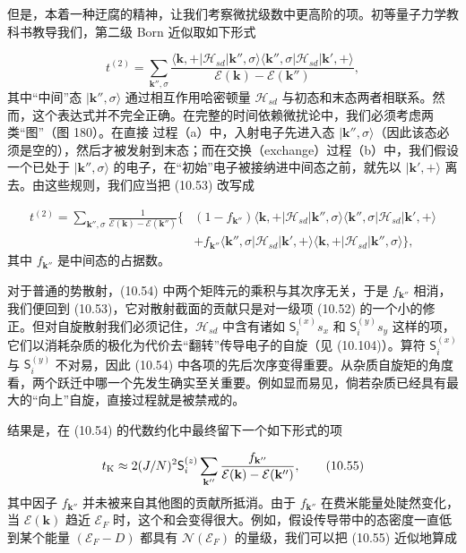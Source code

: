 但是，本着一种迂腐的精神，让我们考察微扰级数中更高阶的项。初等量子力学教科书教导我们，第二级 Born 近似取如下形式

\begin{equation*}
t^{(2)} = \sum_{\mathbf{k}'',\sigma} \frac{\langle \mathbf{k}, + | \mathcal{H}_{sd} | \mathbf{k}'', \sigma \rangle \langle \mathbf{k}'', \sigma | \mathcal{H}_{sd} | \mathbf{k}', + \rangle}{\mathcal{E}(\mathbf{k}) - \mathcal{E}(\mathbf{k}'')}, \tag{10.53}
\end{equation*}
其中“中间”态 $|\mathbf{k}'',\sigma\rangle$ 通过相互作用哈密顿量 $\mathcal{H}_{sd}$ 与初态和末态两者相联系。然而，这个表达式并不完全正确。在完整的时间依赖微扰论中，我们必须考虑两类“图”（图 180）。在直接
过程（a）中，入射电子先进入态 $|\mathbf{k}'',\sigma\rangle$（因此该态必须是空的），然后才被发射到末态；而在交换（exchange）过程（b）中，我们假设一个已处于 $|\mathbf{k}'',\sigma\rangle$ 的电子，在“初始”电子被接纳进中间态之前，就先以 $|\mathbf{k}',+\rangle$ 离去。由这些规则，我们应当把 (10.53) 改写成

\begin{align*}
t^{(2)} = \sum_{\mathbf{k}'',\sigma} \frac{1}{\mathcal{E}(\mathbf{k}) - \mathcal{E}(\mathbf{k}'')} \big\{ &(1 - f_{\mathbf{k}''}) \langle \mathbf{k}, + | \mathcal{H}_{sd} | \mathbf{k}'', \sigma \rangle \langle \mathbf{k}'', \sigma | \mathcal{H}_{sd} | \mathbf{k}', + \rangle \\
&+ f_{\mathbf{k}''} \langle \mathbf{k}'', \sigma | \mathcal{H}_{sd} | \mathbf{k}', + \rangle \langle \mathbf{k}, + | \mathcal{H}_{sd} | \mathbf{k}'', \sigma \rangle \big\}, \tag{10.54}
\end{align*}
其中 $f_{\mathbf{k}''}$ 是中间态的占据数。

对于普通的势散射，(10.54) 中两个矩阵元的乘积与其次序无关，于是 $f_{\mathbf{k}''}$ 相消，我们便回到 (10.53)，它对散射截面的贡献只是对一级项 (10.52) 的一个小的修正。但对自旋散射我们必须记住，$\mathcal{H}_{sd}$ 中含有诸如 $\mathsf{S}_i^{(x)} s_x$ 和 $\mathsf{S}_i^{(y)} s_y$ 这样的项，它们以消耗杂质的极化为代价去“翻转”传导电子的自旋（见 (10.104)）。算符 $\mathsf{S}_i^{(x)}$ 与 $\mathsf{S}_i^{(y)}$ 不对易，因此 (10.54) 中各项的先后次序变得重要。从杂质自旋矩的角度看，两个跃迁中哪一个先发生确实至关重要。例如显而易见，倘若杂质已经具有最大的“向上”自旋，直接过程就是被禁戒的。

结果是，在 (10.54) 的代数约化中最终留下一个如下形式的项

\begin{equation*}
t_{\rm K} \approx 2(J/N)^2 \mathsf{S}_i^{(z)} \sum_{\mathbf{k}''} \frac{f_{\mathbf{k}''}}{\mathcal{E}(\mathbf{k}) - \mathcal{E}(\mathbf{k}'')}, \tag{10.55}
\end{equation*}
其中因子 $f_{\mathbf{k}''}$ 并未被来自其他图的贡献所抵消。由于 $f_{\mathbf{k}''}$ 在费米能量处陡然变化，当 $\mathcal{E}(\mathbf{k})$ 趋近 $\mathcal{E}_F$ 时，这个和会变得很大。例如，假设传导带中的态密度一直低到某个能量 $(\mathcal{E}_F - D)$ 都具有 $\mathcal{N}(\mathcal{E}_F)$ 的量级，我们可以把 (10.55) 近似地算成

